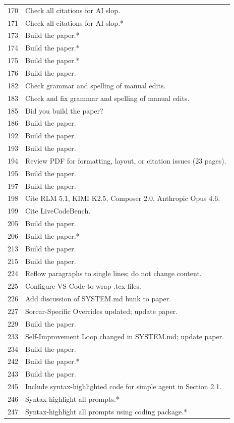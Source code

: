 \documentclass{article}
\begin{document}
\begin{longtable}{rp{}}
170 & Check all citations for AI slop. \\
171 & Check all citations for AI slop.* \\
173 & Build the paper.* \\
174 & Build the paper.* \\
175 & Build the paper.* \\
176 & Build the paper. \\
182 & Check grammar and spelling of manual edits. \\
183 & Check and fix grammar and spelling of manual edits. \\
185 & Did you build the paper? \\
186 & Build the paper. \\
192 & Build the paper. \\
193 & Build the paper. \\
194 & Review PDF for formatting, layout, or citation issues (23 pages). \\
195 & Build the paper. \\
197 & Build the paper. \\
198 & Cite RLM 5.1, KIMI K2.5, Composer 2.0, Anthropic Opus 4.6. \\
199 & Cite LiveCodeBench. \\
205 & Build the paper. \\
206 & Build the paper.* \\
213 & Build the paper. \\
215 & Build the paper. \\
224 & Reflow paragraphs to single lines; do not change content. \\
225 & Configure VS Code to wrap .tex files. \\
226 & Add discussion of SYSTEM.md hunk to paper. \\
227 & Sorcar-Specific Overrides updated; update paper. \\
229 & Build the paper. \\
233 & Self-Improvement Loop changed in SYSTEM.md; update paper. \\
234 & Build the paper. \\
242 & Build the paper.* \\
243 & Build the paper. \\
245 & Include syntax-highlighted code for simple agent in Section 2.1. \\
246 & Syntax-highlight all prompts.* \\
247 & Syntax-highlight all prompts using coding package.* \\

\end{longtable}
\end{document}
